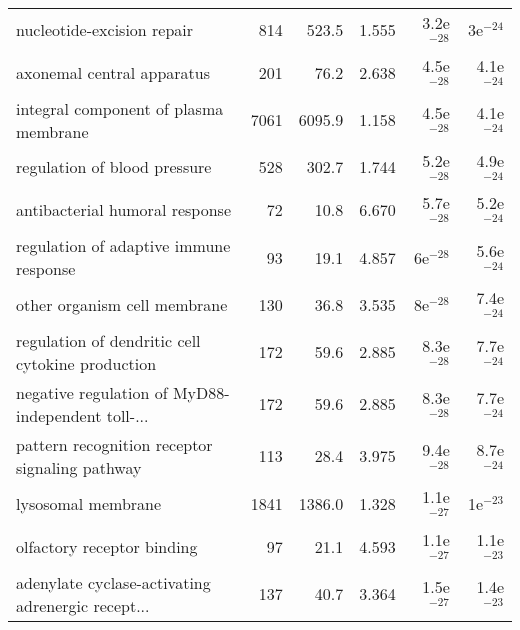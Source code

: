 \begin{longtable}{lrrrrr}
                        nucleotide-excision repair &                     814 &                   523.5 &      1.555 &         3.2e$^{-28}$ &           3e$^{-24}$ \\
                        axonemal central apparatus &                     201 &                    76.2 &      2.638 &         4.5e$^{-28}$ &         4.1e$^{-24}$ \\
             integral component of plasma membrane &                    7061 &                  6095.9 &      1.158 &         4.5e$^{-28}$ &         4.1e$^{-24}$ \\
                      regulation of blood pressure &                     528 &                   302.7 &      1.744 &         5.2e$^{-28}$ &         4.9e$^{-24}$ \\
                    antibacterial humoral response &                      72 &                    10.8 &      6.670 &         5.7e$^{-28}$ &         5.2e$^{-24}$ \\
            regulation of adaptive immune response &                      93 &                    19.1 &      4.857 &           6e$^{-28}$ &         5.6e$^{-24}$ \\
                      other organism cell membrane &                     130 &                    36.8 &      3.535 &           8e$^{-28}$ &         7.4e$^{-24}$ \\
  regulation of dendritic cell cytokine production &                     172 &                    59.6 &      2.885 &         8.3e$^{-28}$ &         7.7e$^{-24}$ \\
 negative regulation of MyD88-independent toll-... &                     172 &                    59.6 &      2.885 &         8.3e$^{-28}$ &         7.7e$^{-24}$ \\
    pattern recognition receptor signaling pathway &                     113 &                    28.4 &      3.975 &         9.4e$^{-28}$ &         8.7e$^{-24}$ \\
                                lysosomal membrane &                    1841 &                  1386.0 &      1.328 &         1.1e$^{-27}$ &           1e$^{-23}$ \\
                        olfactory receptor binding &                      97 &                    21.1 &      4.593 &         1.1e$^{-27}$ &         1.1e$^{-23}$ \\
 adenylate cyclase-activating adrenergic recept... &                     137 &                    40.7 &      3.364 &         1.5e$^{-27}$ &         1.4e$^{-23}$ \\

\end{longtable}
